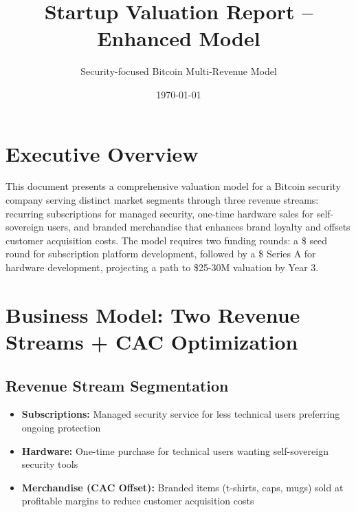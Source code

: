 \documentclass[11pt]{article}
\begin{document}
\title{Startup Valuation Report -- Enhanced Model}
\author{Security-focused Bitcoin Multi-Revenue Model}
\date{\today}
\maketitle

\section*{Executive Overview}
This document presents a comprehensive valuation model for a Bitcoin security company serving distinct market segments through three revenue streams: recurring subscriptions for managed security, one-time hardware sales for self-sovereign users, and branded merchandise that enhances brand loyalty and offsets customer acquisition costs. The model requires two funding rounds: a \$\seedAmount{} seed round for subscription platform development, followed by a \$\seriesAAmount{} Series A for hardware development, projecting a path to \$25-30M valuation by Year 3.

\section{Business Model: Two Revenue Streams + CAC Optimization}

\subsection{Revenue Stream Segmentation}
\begin{itemize}
  \item \textbf{Subscriptions:} Managed security service for less technical users preferring ongoing protection
  \item \textbf{Hardware:} One-time purchase for technical users wanting self-sovereign security tools
  \item \textbf{Merchandise (CAC Offset):} Branded items (t-shirts, caps, mugs) sold at profitable margins to reduce customer acquisition costs
\end{itemize}
\end{document}
